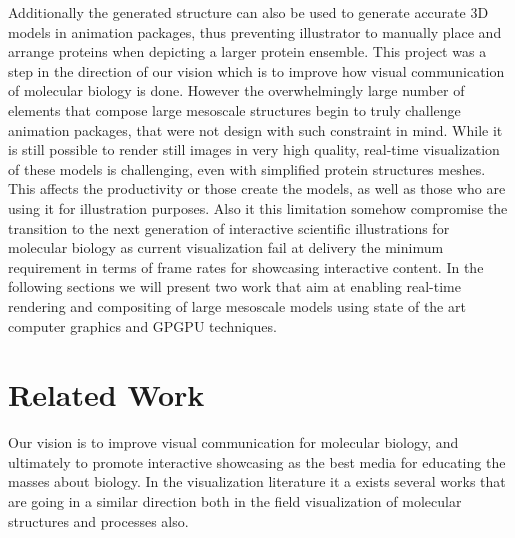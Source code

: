 Additionally the generated structure can also be used to generate accurate 3D models in animation packages, thus preventing illustrator to manually place and arrange proteins when depicting a larger protein ensemble.
This project was a step in the direction of our vision which is to improve how visual communication of molecular biology is done.
However the overwhelmingly large number of elements that compose large mesoscale structures begin to truly challenge animation packages, that were not design with such constraint in mind.
While it is still possible to render still images in very high quality, real-time visualization of these models is challenging, even with simplified protein structures meshes. 
This affects the productivity or those create the models, as well as those who are using it for illustration purposes.
Also it this limitation somehow compromise the transition to the next generation of interactive scientific illustrations for molecular biology as current visualization fail at delivery the minimum requirement in terms of frame rates for showcasing interactive content.
In the following sections we will present two work that aim at enabling real-time rendering and compositing of large mesoscale models using state of the art computer graphics and GPGPU techniques.

\section{Related Work}

Our vision is to improve visual communication for molecular biology, and ultimately to promote interactive showcasing as the best media for educating the masses about biology.
In the visualization literature it a exists several works that are going in a similar direction both in the field visualization of molecular structures and processes also.

